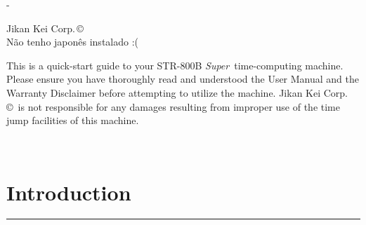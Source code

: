 \documentclass[a5paper,onecolumn,final,10pt]{memoir}
\newcommand\machinename%
	{\textsf{STR-800B \textit{Super}}}
\newcommand\companyname%
	{Jikan Kei Corp.\,\copyright}
\begin{document}
\frontmatter

\begin{titlingpage}
\calccentering{\unitlength}
\begin{adjustwidth*}{\unitlength}{-\unitlength}
	\centering
	
	\vspace*{4\baselineskip}
	
	
	\vfill
	
	{\footnotesize \companyname \\ Não tenho japonês instalado :(}
\end{adjustwidth*}
\end{titlingpage}



\thispagestyle{empty}

\begin{footnotesize}
\noindent
This is a quick-start guide to your \machinename\ time-computing machine. 
Please ensure you have thoroughly read and understood the User Manual and the Warranty Disclaimer before attempting to utilize the machine. 
\companyname\ is not responsible for any damages resulting from improper use of the time jump facilities of this machine. 

~

\end{footnotesize}



\clearpage
\renewcommand\cftchapterfont{\ttfamily}
\renewcommand\cftchapterleader{\ttfamily\cftdotfill{.}}  %
\renewcommand\cftchapterpagefont{\ttfamily}
\tableofcontents*



\mainmatter

\section{Introduction}
\vspace*{-20pt}\rule{\textwidth}{0.8pt}
\end{document}
